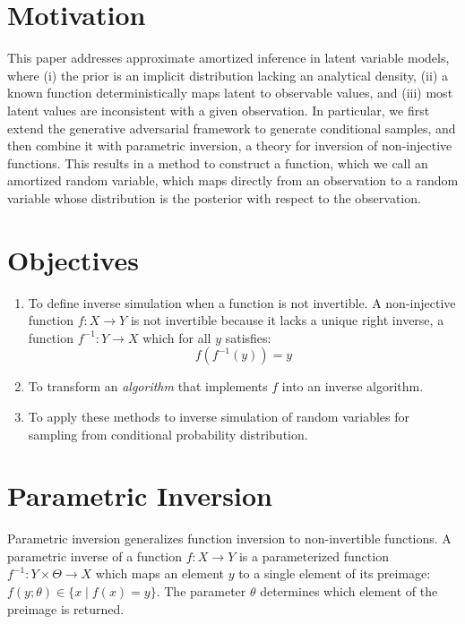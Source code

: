 \documentclass{sciposter}
\theoremstyle{definition} %
\begin{document}
\begin{multicols}{3}

\section{Motivation}
This paper addresses approximate amortized inference in latent variable models, where (i) the prior is an implicit distribution lacking an analytical density, (ii) a known function deterministically maps latent to observable values, and (iii) most latent values are inconsistent with a given observation.
In particular, we first extend the generative adversarial framework to generate conditional samples, and then combine it with parametric inversion, a theory for inversion of non-injective functions.
This results in a method to construct a function, which we call an amortized random variable, which maps directly from an observation to a random variable whose distribution is the posterior with respect to the observation.

\section{Objectives}


\begin{enumerate}
\item To define inverse simulation when a function is not invertible.
A non-injective function $f:X \to Y$ is not invertible because it lacks a unique right inverse, a function $f^{-1}:Y \to X$ which for all $y$ satisfies:
\begin{equation}\label{eq:rightinverse}
f(f^{-1}(y)) = y
\end{equation}

\item To transform an \emph{algorithm} that implements $f$ into an inverse algorithm.

\item To apply these methods to inverse simulation of random variables for sampling from conditional probability distribution.
\end{enumerate}


\section{Parametric Inversion}

Parametric inversion generalizes function inversion to non-invertible functions.
A parametric inverse of a function $f:X \to Y$ is a parameterized function $f^{-1}:Y \times \Theta \to X$ which maps an element $y$ to a single element of its preimage: $f(y; \theta) \in \{x \mid f(x) = y\}$.
The parameter $\theta$ determines which element of the preimage is returned.


\end{multicols}
\end{document}
